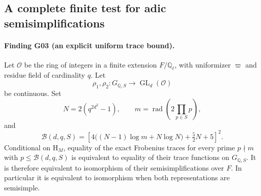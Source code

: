 \documentclass[11pt,a4paper]{article}
\begin{document}
\subsection{A complete finite test for adic semisimplifications}

\paragraph{Finding G03 (an explicit uniform trace bound).}
Let $\mathcal O$ be the ring of integers in a finite extension $F/\mathbb Q_\ell$, with uniformizer $\varpi$ and residue field of cardinality $q$.  Let
\[
 \rho_1,\rho_2:G_{\mathbb Q,S}\longrightarrow\operatorname{GL}_d(\mathcal O)
\]
be continuous.  Set
\[
 N=2(q^{2d^2}-1),\qquad
 m=\operatorname{rad}\!\left(2\prod_{p\in S}p\right),
\]
and
\[
 \mathcal B(d,q,S)=
 \left[4\bigl((N-1)\log m+N\log N\bigr)+\tfrac52 N+5\right]^2.
 \tag{G03.1}
\]
Conditional on $\mathrm{H}_M$, equality of the exact Frobenius traces for every prime $p\nmid m$ with $p\le\mathcal B(d,q,S)$ is equivalent to equality of their trace functions on $G_{\mathbb Q,S}$.  It is therefore equivalent to isomorphism of their semisimplifications over $F$.  In particular it is equivalent to isomorphism when both representations are semisimple.
\end{document}
